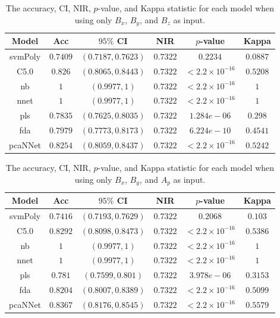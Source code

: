 \documentclass[sn-mathphys-num]{sn-jnl}%
\begin{document}
\begin{table}[!ht]
    \centering
    \caption{The accuracy, CI, NIR, $p$-value, and Kappa statistic for each model when using only $B_{x}$, $B_{y}$, and $B_{z}$ as input.}
	\label{tab:stats:reverse:coord}
	\begin{tabular}{|c|c|c|c|c|c|}
		\hline
		Model & Acc & $95\%$ CI & NIR & $p$-value & Kappa \\ \hline
		svmPoly & $0.7409$ & $(0.7187, 0.7623)$ & $0.7322$ & $0.2234$ & $0.0887$ \\ \hline
		C5.0 & $0.826$ & $(0.8065, 0.8443)$ & $0.7322$ & $< 2.2 \times {10}^{-16}$ & $0.5208$ \\ \hline
		nb & $1$ & $(0.9977, 1)$ & $0.7322$ & $< 2.2 \times {10}^{-16}$ & $1$ \\ \hline
		nnet & $1$ & $(0.9977, 1)$ & $0.7322$ & $< 2.2 \times {10}^{-16}$ & $1$ \\ \hline
		pls & $0.7835$ & $(0.7625, 0.8035)$ & $0.7322$ & $1.284e-06$ & $0.298$ \\ \hline
		fda & $0.7979$ & $(0.7773, 0.8173)$ & $0.7322$ & $6.224e-10$ & $0.4541$ \\ \hline
		pcaNNet & $0.8254$ & $(0.8059, 0.8437)$ & $0.7322$ & $< 2.2 \times {10}^{-16}$ & $0.5242$ \\ \hline
	\end{tabular}
\end{table}

\begin{table}[!ht]
    \centering
    \caption{The accuracy, CI, NIR, $p$-value, and Kappa statistic for each model when using only $B_{x}$, $B_{y}$, and $A_{p}$ as input.}
	\label{tab:stats:reverse:xyap}
	\begin{tabular}{|c|c|c|c|c|c|}
		\hline
		Model & Acc & $95\%$ CI & NIR & $p$-value & Kappa \\ \hline
		svmPoly & $0.7416$ & $(0.7193, 0.7629)$ & $0.7322$ & $0.2068$ & $0.103$ \\ \hline
		C5.0 & $0.8292$ & $(0.8098, 0.8473)$ & $0.7322$ & $< 2.2 \times {10}^{-16}$ & $0.5386$ \\ \hline
		nb & $1$ & $(0.9977, 1)$ & $0.7322$ & $< 2.2 \times {10}^{-16}$ & $1$ \\ \hline
		nnet & $1$ & $(0.9977, 1)$ & $0.7322$ & $< 2.2 \times {10}^{-16}$ & $1$ \\ \hline
		pls & $0.781$ & $(0.7599, 0.801)$ & $0.7322$ & $3.978e-06$ & $0.3153$ \\ \hline
		fda & $0.8204$ & $(0.8007, 0.8389)$ & $0.7322$ & $< 2.2 \times {10}^{-16}$ & $0.5099$ \\ \hline
		pcaNNet & $0.8367$ & $(0.8176, 0.8545)$ & $0.7322$ & $< 2.2 \times {10}^{-16}$ & $0.5579$ \\ \hline
	\end{tabular}
\end{table}
\end{document}
